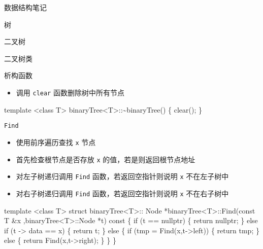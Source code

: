 \documentclass[
  ignorenonframetext,
]{beamer}
\newenvironment{Shaded}{}{}
\newcommand{\NormalTok}[1]{#1}
\providecommand{\tightlist}{%
  \setlength{\itemsep}{0pt}\setlength{\parskip}{0pt}}
\begin{document}
\begin{frame}[fragile]{数据结构笔记}
\begin{block}{树}
\begin{block}{二叉树}
\begin{block}{二叉树类}
\begin{block}{析构函数}
\protect{}\label{ux6790ux6784ux51fdux6570-5}
\begin{itemize}
\tightlist
\item
  调用 \texttt{clear} 函数删除树中所有节点
\end{itemize}

\begin{Shaded}
\begin{Highlighting}[]
\NormalTok{template \textless{}class T\textgreater{}}
\NormalTok{binaryTree\textless{}T\textgreater{}::\textasciitilde{}binaryTree()}
\NormalTok{\{}
\NormalTok{  clear();}
\NormalTok{\}}
\end{Highlighting}
\end{Shaded}
\end{block}

\begin{block}{\texttt{Find}}
\protect{}\label{find}
\begin{itemize}
\tightlist
\item
  使用前序遍历查找 \texttt{x} 节点
\item
  首先检查根节点是否存放 \texttt{x} 的值，若是则返回根节点地址
\item
  对左子树递归调用 \texttt{Find} 函数，若返回空指针则说明 \texttt{x}
  不在左子树中
\item
  对右子树递归调用 \texttt{Find} 函数，若返回空指针则说明 \texttt{x}
  不在右子树中
\end{itemize}

\begin{Shaded}
\begin{Highlighting}[]
\NormalTok{template \textless{}class T\textgreater{}}
\NormalTok{struct binaryTree\textless{}T\textgreater{}:: Node *binaryTree\textless{}T\textgreater{}::Find(const T \&x ,binaryTree\textless{}T\textgreater{}::Node *t) const}
\NormalTok{\{}
\NormalTok{  if (t == nullptr)}
\NormalTok{  \{}
\NormalTok{    return nullptr;}
\NormalTok{  \}}
\NormalTok{  else if (t {-}\textgreater{} data == x)}
\NormalTok{  \{}
\NormalTok{    return t;}
\NormalTok{  \}}
\NormalTok{  else}
\NormalTok{  \{}
\NormalTok{    if (tmp = Find(x,t{-}\textgreater{}left))}
\NormalTok{    \{}
\NormalTok{      return tmp;}
\NormalTok{    \}}
\NormalTok{    else}
\NormalTok{    \{}
\NormalTok{      return Find(x,t{-}\textgreater{}right);}
\NormalTok{    \}}
\NormalTok{  \}}
\NormalTok{\}}
\end{Highlighting}
\end{Shaded}
\end{block}


\end{block}
\end{block}
\end{block}
\end{frame}
\end{document}
